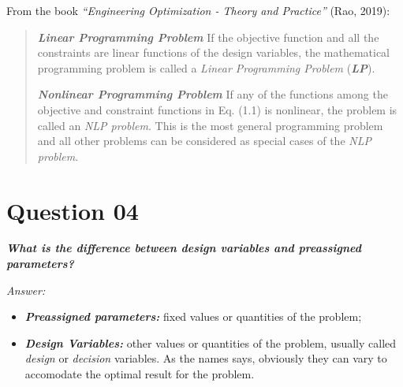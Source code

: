 \documentclass[conference]{IEEEtran}
\begin{document}
From the book \textit{``Engineering Optimization - Theory and Practice''}  (Rao, 2019):

\begin{quotation}
	\textbf{\textit{Linear Programming Problem}} If the objective function and all the constraints are linear functions of the design variables, the mathematical programming problem is called a \textit{Linear Programming Problem} (\textbf{\textit{LP}}). 
	
	\textbf{\textit{Nonlinear Programming Problem}} If any of the functions among the objective and
	constraint functions in Eq. (1.1) is nonlinear, the problem is called an \textit{NLP problem}.
	This is the most general programming problem and all other problems can be considered as special cases of the \textit{NLP problem}.
	
\end{quotation}

\section{Question 04}

\textbf{\textit{What is the difference between design variables and	preassigned parameters?}}

\textit{Answer:}

\begin{itemize}
	\item \textit{\textbf{Preassigned parameters:}} fixed values or quantities of the problem;
	\item \textit{\textbf{Design Variables:}} other values or quantities of the problem, usually called \textit{design} or \textit{decision} variables. As the names says, obviously they can vary to accomodate the optimal result for the problem.
\end{itemize}
\end{document}
